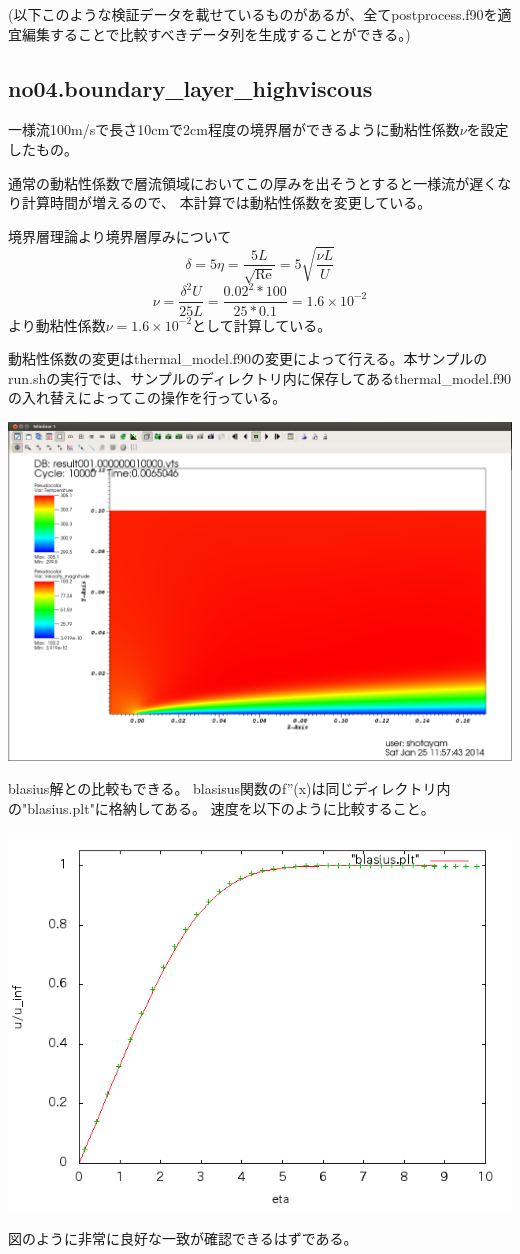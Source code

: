 \documentclass{jsarticle}
\begin{document}
(以下このような検証データを載せているものがあるが、全てpostprocess.f90を適宜編集することで比較すべきデータ列を生成することができる。)
\subsection{no04.boundary\_layer\_highviscous}%
一様流100m/sで長さ10cmで2cm程度の境界層ができるように動粘性係数$\nu$を設定したもの。

通常の動粘性係数で層流領域においてこの厚みを出そうとすると一様流が遅くなり計算時間が増えるので、
本計算では動粘性係数を変更している。

境界層理論より境界層厚みについて
\begin{equation}
\delta=5\eta=\frac{5L}{\sqrt{\mathrm{Re} }}=5\sqrt{\frac{\nu L}{U}}
\end{equation}
\begin{equation}
\nu=\frac{\delta ^2 U}{25L}=\frac{0.02^2*100}{25*0.1}=1.6\times10^{-2}
\end{equation}
より動粘性係数$\nu=1.6\times10^{-2}$として計算している。

動粘性係数の変更はthermal\_model.f90の変更によって行える。本サンプルのrun.shの実行では、サンプルのディレクトリ内に保存してあるthermal\_model.f90の入れ替えによってこの操作を行っている。
\begin{center}
\includegraphics[width=.8\textwidth,bb=0 0 1571 1057]{sample/no04.png}
\end{center}
blasius解との比較もできる。
blasisus関数のf''(x)は同じディレクトリ内の"blasius.plt"に格納してある。
速度を以下のように比較すること。
\begin{center}
\includegraphics[width=.7\textwidth,bb=0 0 640 480]{sample/no04.01.png}
\end{center}
図のように非常に良好な一致が確認できるはずである。
\end{document}
